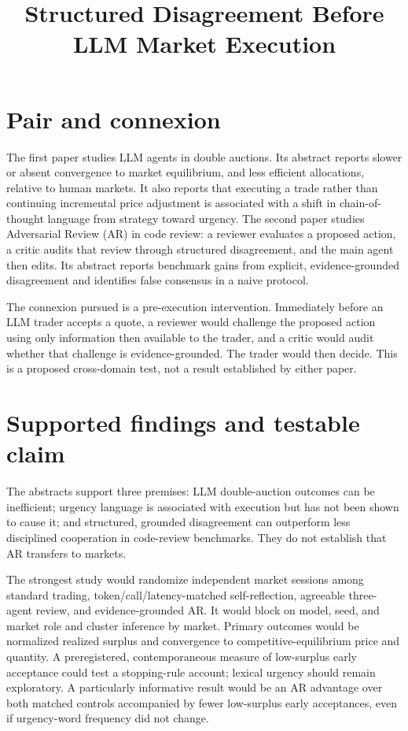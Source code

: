 \documentclass{article}
\title{Structured Disagreement Before LLM Market Execution}
\begin{document}
\maketitle

\section{Pair and connexion}

The first paper studies LLM agents in double auctions.  Its abstract reports slower or absent convergence to market equilibrium, and less efficient allocations, relative to human markets.  It also reports that executing a trade rather than continuing incremental price adjustment is associated with a shift in chain-of-thought language from strategy toward urgency.  The second paper studies Adversarial Review (AR) in code review: a reviewer evaluates a proposed action, a critic audits that review through structured disagreement, and the main agent then edits.  Its abstract reports benchmark gains from explicit, evidence-grounded disagreement and identifies false consensus in a naive protocol.

The connexion pursued is a pre-execution intervention.  Immediately before an LLM trader accepts a quote, a reviewer would challenge the proposed action using only information then available to the trader, and a critic would audit whether that challenge is evidence-grounded.  The trader would then decide.  This is a proposed cross-domain test, not a result established by either paper. 

\section{Supported findings and testable claim}

The abstracts support three premises: LLM double-auction outcomes can be inefficient; urgency language is associated with execution but has not been shown to cause it; and structured, grounded disagreement can outperform less disciplined cooperation in code-review benchmarks.  They do not establish that AR transfers to markets. 

The strongest study would randomize independent market sessions among standard trading, token/call/latency-matched self-reflection, agreeable three-agent review, and evidence-grounded AR.  It would block on model, seed, and market role and cluster inference by market.  Primary outcomes would be normalized realized surplus and convergence to competitive-equilibrium price and quantity.  A preregistered, contemporaneous measure of low-surplus early acceptance could test a stopping-rule account; lexical urgency should remain exploratory.  A particularly informative result would be an AR advantage over both matched controls accompanied by fewer low-surplus early acceptances, even if urgency-word frequency did not change. 
\end{document}
